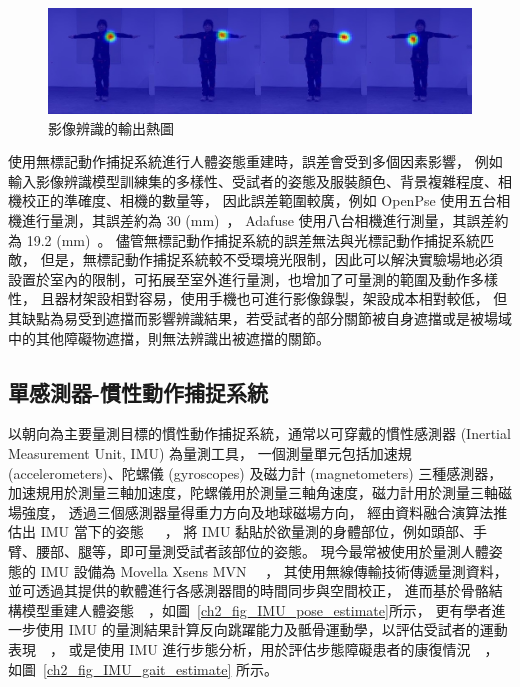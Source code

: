\begin{figure}[!ht]
    \centering
    \includegraphics[width=\linewidth]{figure/ch2_fig_heatmap.jpg}
     \caption[影像辨識的輸出熱圖]{影像辨識的輸出熱圖}
     \label{ch2_fig_heatmap}
\end{figure}

使用無標記動作捕捉系統進行人體姿態重建時，誤差會受到多個因素影響，
例如輸入影像辨識模型訓練集的多樣性、受試者的姿態及服裝顏色、背景複雜程度、相機校正的準確度、相機的數量等，
因此誤差範圍較廣，例如 OpenPse 使用五台相機進行量測，其誤差約為 30 (mm)~\cite{nakano2020evaluation}，
Adafuse 使用八台相機進行測量，其誤差約為 19.2 (mm)~\cite{zhang2020adafuse}。
儘管無標記動作捕捉系統的誤差無法與光標記動作捕捉系統匹敵，
但是，無標記動作捕捉系統較不受環境光限制，因此可以解決實驗場地必須設置於室內的限制，可拓展至室外進行量測，也增加了可量測的範圍及動作多樣性，
且器材架設相對容易，使用手機也可進行影像錄製，架設成本相對較低，
但其缺點為易受到遮擋而影響辨識結果，若受試者的部分關節被自身遮擋或是被場域中的其他障礙物遮擋，則無法辨識出被遮擋的關節。

\subsection{單感測器-慣性動作捕捉系統}
以朝向為主要量測目標的慣性動作捕捉系統，通常以可穿戴的慣性感測器 (Inertial Measurement Unit, IMU) 為量測工具，
一個測量單元包括加速規 (accelerometers)、陀螺儀 (gyroscopes) 及磁力計 (magnetometers) 三種感測器，
加速規用於測量三軸加速度，陀螺儀用於測量三軸角速度，磁力計用於測量三軸磁場強度，
透過三個感測器量得重力方向及地球磁場方向，
經由資料融合演算法推估出 IMU 當下的姿態~\cite{young2009comparison}~\cite{madgwick2011estimation}~\cite{nazarahari202140}，
將 IMU 黏貼於欲量測的身體部位，例如頭部、手臂、腰部、腿等，即可量測受試者該部位的姿態。
現今最常被使用於量測人體姿態的 IMU 設備為 Movella Xsens MVN ~\cite{roetenberg2009xsens}~\cite{paulich2018xsens}，
其使用無線傳輸技術傳遞量測資料，並可透過其提供的軟體進行各感測器間的時間同步與空間校正，
進而基於骨骼結構模型重建人體姿態~\cite{mcgrath2020body}~\cite{DIP:SIGGRAPHAsia:2018}，如圖~\ref{ch2_fig_IMU_pose_estimate}所示，
更有學者進一步使用 IMU 的量測結果計算反向跳躍能力及骶骨運動學，以評估受試者的運動表現~\cite{mcginnis2016quantifying}~\cite{miranda2022accuracy}，
或是使用 IMU 進行步態分析，用於評估步態障礙患者的康復情況~\cite{wang2020imu}~\cite{uchitomi2022three}，如圖~\ref{ch2_fig_IMU_gait_estimate} 所示。

